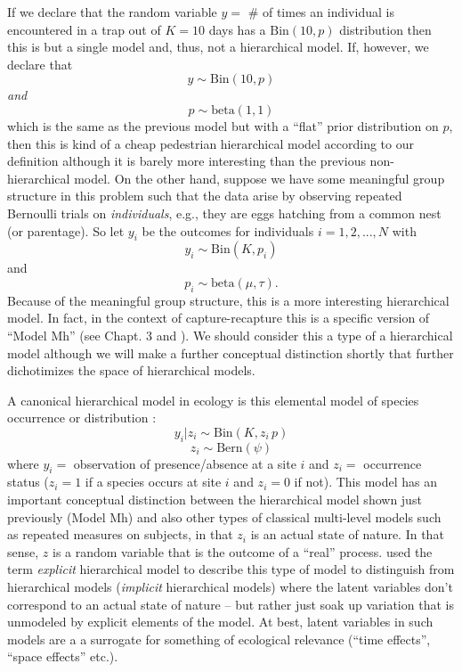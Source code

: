 If we declare that the random variable $y = $ \# of times an
individual is encountered in a trap out of $K=10$ days has a
$\mbox{Bin}(10, p)$ distribution then this is but a single model and,
thus, not a hierarchical model. If, however, we declare that
\[
y \sim \mbox{Bin}(10,p)
\]
{\it and}
\[
p \sim \mbox{beta}(1,1)
\]
which is the same as the previous model but with a ``flat'' prior
distribution on $p$, then this is kind of a cheap pedestrian
hierarchical model according to our definition although it is barely
more interesting than the previous non-hierarchical model.
On the
other hand, suppose we have some meaningful group structure in this
problem such that the data arise by observing repeated Bernoulli
trials on {\it individuals}, e.g., they are eggs hatching from a
common nest (or parentage). So let $y_{i}$ be the outcomes for
individuals $i=1,2,...,N$ with
\[
y_{i} \sim \mbox{Bin}(K, p_{i})
\]
 and
\[
p_{i}\sim \mbox{beta}(\mu, \tau).
\]
Because of the meaningful group structure, this is a more interesting
hierarchical model. In fact, in the context of capture-recapture this
is a specific version of ``Model Mh'' (see Chapt. 3 and
\citet{dorazio_royle:2003}).  We should consider this a type of a
hierarchical model although we will make a further conceptual
distinction shortly that further dichotimizes the space of
hierarchical models.

A canonical hierarchical model in ecology is this
elemental model of species occurrence or distribution
\citep{mackenzie_etal:2002, tyre_etal:2003, kery:2011}:
\[
y_{i}|z_{i} \sim \mbox{Bin}(K,z_{i} \,  p)
\]
\[
z_{i} \sim \mbox{Bern}(\psi)
\]
where  $y_{i} = $ observation of presence/absence at a site $i$ and
$z_{i} = $ occurrence status ($z_{i}=1$ if a species occurs at  site
$i$ and $z_{i}=0$ if not).  This model has an important conceptual
distinction between the hierarchical model shown just previously
(Model Mh) and also other types of classical multi-level models such
as repeated measures on subjects, in that $z_{i}$ is an actual state
of nature. In that sense, $z$ is a random variable that is the outcome of a
``real'' process.   \citet{royle_dorazio:2008} used the term {\it
  explicit} hierarchical model to describe this type of model to
distinguish from hierarchical models ({\it implicit} hierarchical
models) where the latent variables don't
correspond to an actual state of nature -- but rather just soak up
variation that is unmodeled by explicit elements of the model.
At best, latent variables in such models
are a a surrogate for something of ecological relevance
(``time effects'', ``space effects'' etc.).


